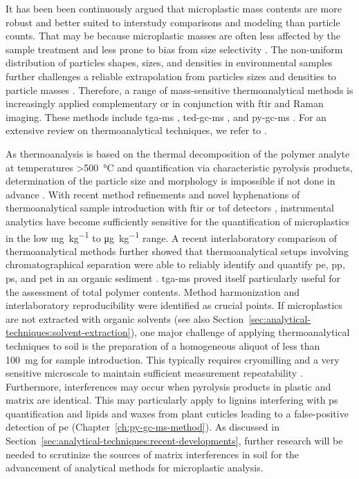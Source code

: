 It has been been continuously argued that microplastic mass contents are more robust and better suited to interstudy comparisons and modeling than particle counts. That may be because microplastic masses are often less affected by the sample treatment and less prone to bias from size selectivity \citep{SimonQuantification2018,BraunMicroplastics2018}. The non-uniform distribution of particles shapes, sizes, and densities in environmental samples further challenges a reliable extrapolation from particles sizes and densities to particle masses \citep{BraunMicroplastics2018}. Therefore, a range of mass-sensitive thermoanalytical methods is increasingly applied complementary or in conjunction with \ac{ftir} and Raman imaging. These methods include \ac{tga-ms} \citep[Chapter~\ref{ch:tga-ms-method};][]{BoyronAdvanced2019},
\ac{ted-gc-ms} \citep{DumichenFast2017}, and \ac{py-gc-ms} \citep{FischerSimultaneous2017,FischerMicroplastics2019}. For an extensive review on thermoanalytical techniques, we refer to \citet{LaNasaReview2020}.

As thermoanalysis is based on the thermal decomposition of the polymer analyte at temperatures \SI{>500}{\degreeCelsius} and quantification via characteristic pyrolysis products, determination of the particle size and morphology is impossible if not done in advance \citep{NguyenSeparation2019,DumichenFast2017}. With recent method refinements \citep[Chapter~\ref{ch:py-gc-ms-method};][]{DierkesQuantification2019} and novel hyphenations of thermoanalytical sample introduction with \ac{ftir} or \ac{tof}
detectors \citep{SullivanDetection2020}, instrumental analytics have become sufficiently sensitive for the quantification of microplastics in the low \si{\milli\gram\per\kilo\gram} to \si{\micro\gram\per\kilo\gram} range. A recent interlaboratory comparison of thermoanalytical methods further showed that thermoanalytical setups involving chromatographical separation were able to reliably identify and quantify \ac{pe}, \ac{pp}, \ac{ps}, and \ac{pet} in an organic sediment \citep{BeckerQuantification2020}. \ac{tga-ms} proved itself particularly useful for the assessment of total polymer contents.
Method harmonization and interlaboratory reproducibility were identified as crucial points. If microplastics are not extracted with organic solvents (see also Section~\ref{sec:analytical-techniques:solvent-extraction}), one major challenge of applying thermoanalytical techniques to soil is the preparation of a homogeneous aliquot of less than \SI{100}{\milli\gram} for sample introduction. This typically requires cryomilling and a very sensitive microscale to maintain sufficient measurement repeatability \citep[Chapter~\ref{ch:py-gc-ms-method};][]{DierkesQuantification2019}.
Furthermore, interferences may occur when pyrolysis products in plastic and matrix are identical. This may particularly apply to lignins interfering with \ac{ps} quantification \citep{FischerSimultaneous2017} and lipids and waxes from plant cuticles leading to a false-positive detection of \ac{pe} (Chapter~\ref{ch:py-gc-ms-method}). As discussed in Section~\ref{sec:analytical-techniques:recent-developments}, further research will be needed to scrutinize the sources of matrix interferences in soil for the advancement of analytical methods for microplastic analysis.

